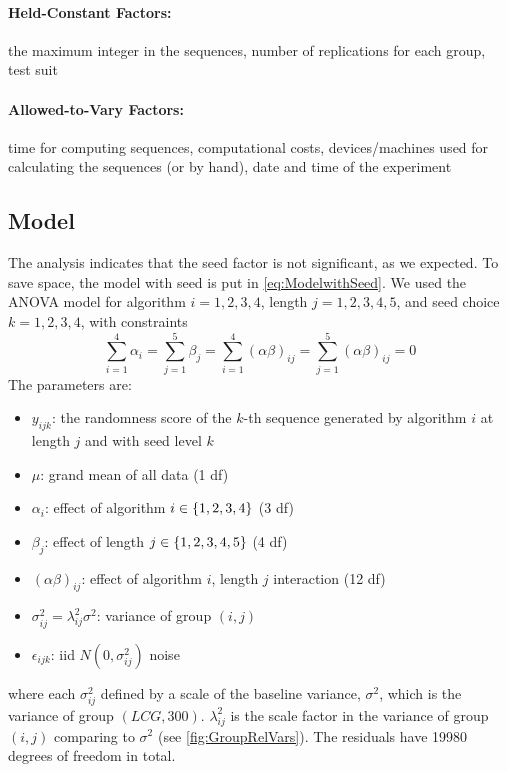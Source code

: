 \documentclass{report}
\begin{document}
\paragraph{Held-Constant Factors:} the maximum integer in the sequences, number of replications for each group, test suit
\paragraph{Allowed-to-Vary Factors:} time for computing sequences, computational costs, devices/machines used for calculating the sequences (or by hand), date and time of the experiment

\subsection{Model}
The analysis indicates that the seed factor is not significant, as we expected. To save space, the model with seed is put in \eqref{eq:ModelwithSeed}. We used the ANOVA model
for algorithm $i=1,2,3,4$, length $j=1,2,3,4,5$, and seed choice $k=1,2,3,4$, with constraints
\[\sum_{i=1}^4 \alpha_i=\sum_{j=1}^5 \beta_j=\sum_{i=1}^4 (\alpha\beta)_{ij}=\sum_{j=1}^5 (\alpha\beta)_{ij}=0\]
The parameters are:
\begin{itemize}
    \item $y_{ijk}$: the randomness score of the $k$-th sequence generated by algorithm $i$ at length $j$ and with seed level $k$
    \item $\mu$: grand mean of all data (1 df)
    \item $\alpha_i$: effect of algorithm $i\in\left\{ {1,2,3,4} \right\}$ (3 df)
    \item $\beta_j$: effect of length $j \in \left\{ {1,2,3,4,5} \right\}$ (4 df)
    \item $(\alpha\beta)_{ij}$: effect of algorithm $i$, length $j$ interaction (12 df)
    \item $\sigma_{ij}^2=\lambda_{ij}^2 \sigma^2$: variance of group $(i,j)$
    \item $\epsilon_{ijk}$: iid $N(0,\sigma_{ij}^2)$ noise
\end{itemize}
where each $\sigma_{ij}^2$ defined by a scale of the baseline variance, $\sigma^2$, which is the variance of group $(LCG,300)$. $\lambda_{ij}^2$ is the scale factor in the variance of group $(i,j)$ comparing to $\sigma^2$ (see \ref{fig:GroupRelVars}). The residuals have 19980 degrees of freedom in total.
\end{document}
